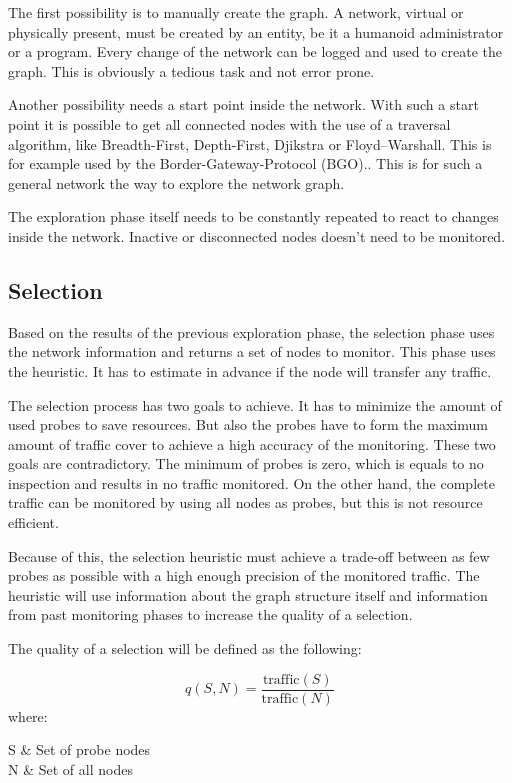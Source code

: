 \documentclass[thesis.tex]{subfiles}
\begin{document}
The first possibility is to manually create the graph. A network, virtual or physically present, must be created by an entity, be it a humanoid administrator or a program. Every change of the network can be logged and used to create the graph. This is obviously a tedious task and not error prone. 

Another possibility needs a start point inside the network. With such a start point it is possible to get all connected nodes with the use of a traversal algorithm, like Breadth-First, Depth-First, Djikstra or Floyd–Warshall. This is for example used by the Border-Gateway-Protocol (BGO).. This is for such a general network the way to explore the network graph.

The exploration phase itself needs to be constantly repeated to react to changes inside the network. Inactive or disconnected nodes doesn't need to be monitored.

\subsection{Selection}

Based on the results of the previous exploration phase, the selection phase uses the network information and returns a set of nodes to monitor. This phase uses the heuristic. It has to estimate in advance if the node will transfer any traffic.

The selection process has two goals to achieve. It has to minimize the amount of used probes to save resources. But also the probes have to form the maximum amount of traffic cover to achieve a high accuracy of the monitoring. These two goals are contradictory. The minimum of probes is zero, which is equals to no inspection and results in no traffic monitored. On the other hand, the complete traffic can be monitored by using all nodes as probes, but this is not resource efficient.

Because of this, the selection heuristic must achieve a trade-off between as few probes as possible with a high enough precision of the monitored traffic. The heuristic will use information about the graph structure itself and information from past monitoring phases to increase the quality of a selection.

The quality of a selection will be defined as the following:

\begin{equation} \label{equo:qualitySelection}
q(S,N) = \frac{\text{traffic}(S)}{\text{traffic}(N)}
\end{equation}
where:
\begin{conditions}
    S     &  Set of probe nodes \\
    N     &  Set of all nodes
\end{conditions}
\end{document}
